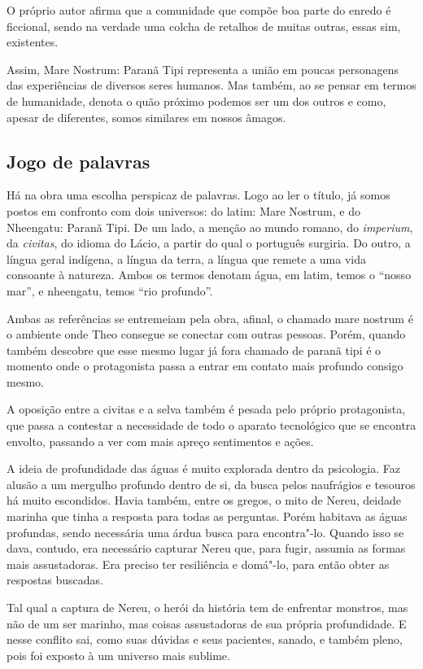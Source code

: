 \documentclass[12pt]{extarticle}
\begin{document}
O próprio autor afirma que a comunidade que compõe boa parte do enredo é
ficcional, sendo na verdade uma colcha de retalhos de muitas outras,
essas sim, existentes.

Assim, Mare Nostrum: Paranã Tipi representa a união em poucas
personagens das experiências de diversos seres humanos. Mas também, ao
se pensar em termos de humanidade, denota o quão próximo podemos ser um
dos outros e como, apesar de diferentes, somos similares em nossos
âmagos.

\subsection{Jogo de palavras}

Há na obra uma escolha perspicaz de palavras. Logo ao ler o título, já
somos postos em confronto com dois universos: do latim: Mare Nostrum, e
do Nheengatu: Paranã Tipi. De um lado, a menção ao mundo romano, do
\emph{imperium}, da \emph{civitas}, do idioma do Lácio, a partir do qual
o português surgiria. Do outro, a língua geral indígena, a língua da
terra, a língua que remete a uma vida consoante à natureza. Ambos os
termos denotam água, em latim, temos o ``nosso mar'', e nheengatu, temos
``rio profundo''.

Ambas as referências se entremeiam pela obra, afinal, o chamado mare
nostrum é o ambiente onde Theo consegue se conectar com outras pessoas.
Porém, quando também descobre que esse mesmo lugar já fora chamado de
paranã tipi é o momento onde o protagonista passa a entrar em contato
mais profundo consigo mesmo.

A oposição entre a civitas e a selva também é pesada pelo próprio
protagonista, que passa a contestar a necessidade de todo o aparato
tecnológico que se encontra envolto, passando a ver com mais apreço
sentimentos e ações.

A ideia de profundidade das águas é muito explorada dentro da
psicologia. Faz alusão a um mergulho profundo dentro de si, da busca
pelos naufrágios e tesouros há muito escondidos. Havia também, entre os
gregos, o mito de Nereu, deidade marinha que tinha a resposta para todas
as perguntas. Porém habitava as águas profundas, sendo necessária uma
árdua busca para encontra"-lo. Quando isso se dava, contudo, era
necessário capturar Nereu que, para fugir, assumia as formas mais
assustadoras. Era preciso ter resiliência e domá"-lo, para então obter as
respostas buscadas.

Tal qual a captura de Nereu, o herói da história tem de enfrentar
monstros, mas não de um ser marinho, mas coisas assustadoras de sua
própria profundidade. E nesse conflito sai, como suas dúvidas e seus
pacientes, sanado, e também pleno, pois foi exposto à um universo mais
sublime.
\end{document}
